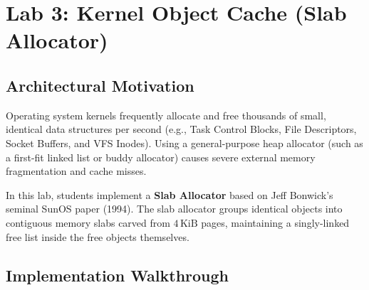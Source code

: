 \section{Lab 3: Kernel Object Cache (Slab Allocator)}
\label{sec:lab3}

\subsection{Architectural Motivation}

Operating system kernels frequently allocate and free thousands of small, identical data structures per second (e.g., Task Control Blocks, File Descriptors, Socket Buffers, and VFS Inodes). Using a general-purpose heap allocator (such as a first-fit linked list or buddy allocator) causes severe external memory fragmentation and cache misses.

In this lab, students implement a \textbf{Slab Allocator} based on Jeff Bonwick's seminal SunOS paper (1994). The slab allocator groups identical objects into contiguous memory slabs carved from $4\,\text{KiB}$ pages, maintaining a singly-linked free list inside the free objects themselves.

\subsection{Implementation Walkthrough}

